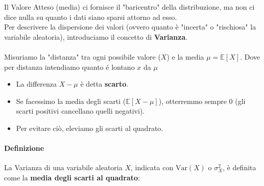 Il Valore Atteso (media) ci fornisce il "baricentro" della distribuzione, ma non ci dice nulla su quanto i dati siano sparsi attorno ad esso.
\\Per descrivere la dispersione dei valori (ovvero quanto è "incerta" o "rischiosa" la variabile aleatoria), introduciamo il concetto di \textbf{Varianza}.

\paragraph{}
Misuriamo la "distanza" tra ogni possibile valore ($X$) e la media $\mu = \mathbb{E}[X]$. Dove per distanza intendiamo quanto é lontano $x$ da $\mu$ 
\begin{itemize}
    \item La differenza $X - \mu$ è detta \textbf{scarto}.
    
    \item Se facessimo la media degli scarti ($\mathbb{E}[X - \mu]$), otterremmo sempre 0 (gli scarti positivi cancellano quelli negativi). 
    
    \begin{center}
    \end{center}
    
    \item Per evitare ciò, eleviamo gli scarti al quadrato.
\end{itemize}
\paragraph{Definizione}
La Varianza di una variabile aleatoria $X$, indicata con $\text{Var}(X)$ o $\sigma_X^2$, è definita come la \textbf{media degli scarti al quadrato}:

